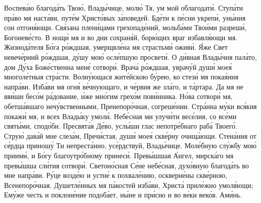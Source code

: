 \begin{mymulticols}

Воспев\'{а}ю благод\'{а}ть Тво\'{ю}, Влад\'{ы}чице, мол\'{ю} Тя, ум мой облагодат\'{и}. Ступ\'{а}ти пр\'{а}во мя наст\'{а}ви, пут\'{е}м Христ\'{о}вых з\'{а}поведей. Бд\'{е}ти к п\'{е}сни укреп\'{и}, ун\'{ы}ния сон отгон\'{я}ющи. Св\'{я}зана плен\'{и}цами грехопад\'{е}ний, мольб\'{а}ми Тво\'{и}ми разреш\'{и}, Богонев\'{е}сто. В нощ\'{и} мя и во дни сохран\'{я}й, бор\'{ю}щих враг избавл\'{я}ющи мя. Жизнод\'{а}теля Б\'{о}га р\'{о}ждшая, умерщвл\'{е}на мя страстьм\'{и} ожив\'{и}. \'{Я}же Свет невеч\'{е}рний р\'{о}ждшая, д\'{у}шу мо\'{ю} осл\'{е}пшую просвет\'{и}. О д\'{и}вная Влад\'{ы}чня пал\'{а}то, дом Д\'{у}ха Бож\'{е}ственна мен\'{е} сотвор\'{и}. Врач\'{а} р\'{о}ждшая, уврач\'{у}й душ\'{и} мое\'{я} многол\'{е}тныя стр\'{а}сти. Волн\'{у}ющася жит\'{е}йскою б\'{у}рею, ко стез\'{и} мя пока\'{я}ния напр\'{а}ви. Изб\'{а}ви мя огн\'{я} в\'{е}чнующаго, и ч\'{е}рвия же зл\'{а}го, и т\'{а}ртара. Да мя не яв\'{и}ши бес\'{о}м р\'{а}дование, \'{и}же мн\'{о}гим грех\'{о}м пов\'{и}нника. Н\'{о}ва сотвор\'{и} мя, обетш\'{а}вшаго неч\'{у}вственными, Пренепор\'{о}чная, согреш\'{е}нии. Стр\'{а}нна м\'{у}ки вс\'{я}кия покаж\'{и} мя, и всех Влад\'{ы}ку умол\'{и}. Неб\'{е}сная ми улуч\'{и}ти вес\'{е}лия, со вс\'{е}ми свят\'{ы}ми, спод\'{о}би. Пресвят\'{а}я Д\'{е}во, усл\'{ы}ши глас непотр\'{е}бнаго раб\'{а} Твоег\'{о}. Стру\'{ю} дав\'{а}й мне слез\'{а}м, Преч\'{и}стая, душ\'{и} мое\'{я} скв\'{е}рну очищ\'{а}ющи. Стен\'{а}ния от с\'{е}рдца принош\'{у} Ти непрест\'{а}нно, ус\'{е}рдствуй, Влад\'{ы}чице. Мол\'{е}бную сл\'{у}жбу мо\'{ю} приим\'{и}, и Б\'{о}гу благоутр\'{о}бному принес\'{и}. Прев\'{ы}шшая \'{А}нгел, мирск\'{а}го мя прев\'{ы}шша сл\'{и}тия сотвор\'{и}. Светон\'{о}сная С\'{е}не неб\'{е}сная, дух\'{о}вную благод\'{а}ть во мне напр\'{а}ви. Р\'{у}це возд\'{е}ю и устн\'{е} к похвал\'{е}нию, оскверн\'{е}ны скв\'{е}рною, Всенепор\'{о}чная. Душетл\'{е}нных мя п\'{а}костей изб\'{а}ви, Христ\'{а} прил\'{е}жно умол\'{я}ющи; Ем\'{у}же честь и поклон\'{е}ние подоб\'{а}ет, н\'{ы}не и пр\'{и}сно и во в\'{е}ки век\'{о}в. Ам\'{и}нь.



\end{mymulticols}
